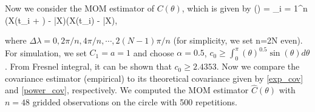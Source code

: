 Now we consider the MOM estimator of $C(\theta)$, which is given by
\beq \label{covarince_estimator}
(\Delta \lambda) = \sum_{i = 1}^n (X(t_i + \Delta \lambda) - \bar{X})(X(t_i) - \bar{X}),
\eeq

\noi where $\Delta \lambda = 0, 2\pi/n, 4\pi/n, \cdots, 2(N-1)\pi/n$ (for simplicity, we set n=2N even). \\

For simulation, we set $C_1 = a = 1$ and choose $\alpha = 0.5$, $c_0 \ge \int_0^\pi(\theta)^{0.5} \sin(\theta) d\theta$. From Fresnel integral, it can be shown that $c_0 \ge 2.4353$. Now we compare the covariance estimator (empirical) to its theoretical covariance given by \eqref{exp_cov} and \eqref{power_cov}, respectively. We computed the MOM estimator $\hat{C}(\theta)$ with $n = 48$ gridded observations on the circle with 500 repetitions.

